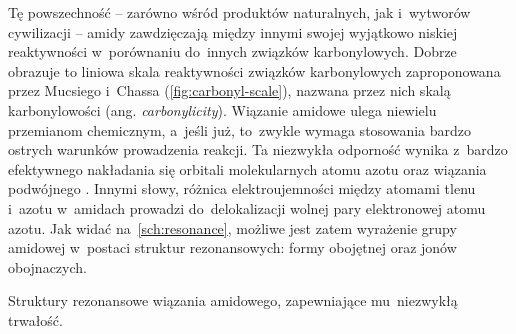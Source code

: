 Tę powszechność \--- zarówno wśród produktów naturalnych, jak i~wytworów cywilizacji \---
  amidy zawdzięczają między innymi swojej wyjątkowo niskiej reaktywności w~porównaniu
  do~innych związków karbonylowych.
Dobrze obrazuje to liniowa skala reaktywności związków karbonylowych zaproponowana
  przez Mucsiego i~Chassa (\cref{fig:carbonyl-scale}),
  nazwana przez nich skalą karbonylowości (ang. \textit{carbonylicity}).
Wiązanie amidowe ulega niewielu przemianom chemicznym, a~jeśli już,
  to~zwykle wymaga stosowania bardzo ostrych warunków prowadzenia reakcji.
Ta niezwykła odporność wynika z~bardzo efektywnego nakładania się orbitali 
  molekularnych atomu azotu oraz \textpi{} wiązania podwójnego .
Innymi słowy, różnica elektroujemności między atomami tlenu i~azotu w~amidach prowadzi
  do~delokalizacji wolnej pary elektronowej atomu azotu.
Jak widać na~\cref{sch:resonance}, możliwe jest zatem wyrażenie grupy amidowej w~postaci
  struktur rezonansowych: formy obojętnej oraz jonów obojnaczych.

\begin{marginscheme}[-19em]
  
  \caption{
    Struktury rezonansowe wiązania amidowego, zapewniające mu~niezwykłą trwałość.
  }
  \label{sch:resonance}
\end{marginscheme}

